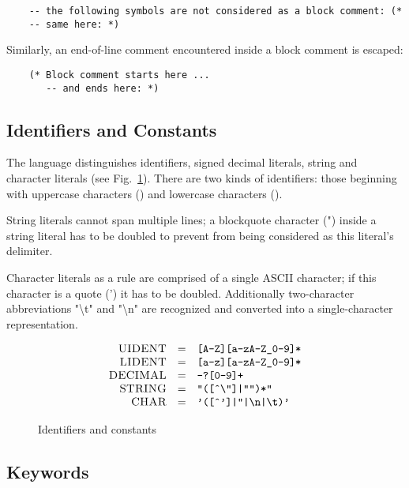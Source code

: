 \begin{lstlisting}
    -- the following symbols are not considered as a block comment: (*
    -- same here: *)
\end{lstlisting}

Similarly, an end-of-line comment encountered inside a block comment is escaped:

\begin{lstlisting}
    (* Block comment starts here ...
       -- and ends here: *)
\end{lstlisting}

\subsection{Identifiers and Constants}

The language distinguishes identifiers, signed decimal literals, string and character literals (see Fig.~\ref{idents_and_consts}). There are
two kinds of identifiers: those beginning with uppercase characters () and lowercase characters ().

String literals cannot span multiple lines; a blockquote character (") inside a string literal has to be doubled to prevent from
being considered as this literal's delimiter.

Character literals as a rule are comprised of a single \textsc{ASCII} character; if this character is a quote (') it has to be doubled. Additionally
two-character abbreviations "\textbackslash t" and "\textbackslash n" are recognized and converted into a single-character representation.

\begin{figure}[t]
  \[
  \begin{array}{rcl}
    \textsc{UIDENT} & = &\mbox{\texttt{[A-Z][a-zA-Z\_0-9]*}}\\
    \textsc{LIDENT} & = &\mbox{\texttt{[a-z][a-zA-Z\_0-9]*}}\\
    \textsc{DECIMAL}& = &\mbox{\texttt{-?[0-9]+}}\\
    \textsc{STRING} & = &\mbox{\texttt{"([\^{}\textbackslash"]|"")*"}}\\
    \textsc{CHAR}   & = &\mbox{\texttt{'([\^{}']|''|\textbackslash n|\textbackslash t)'}}
  \end{array}
  \]
  \caption{Identifiers and constants}
  \label{idents_and_consts}
\end{figure}


\subsection{Keywords}

